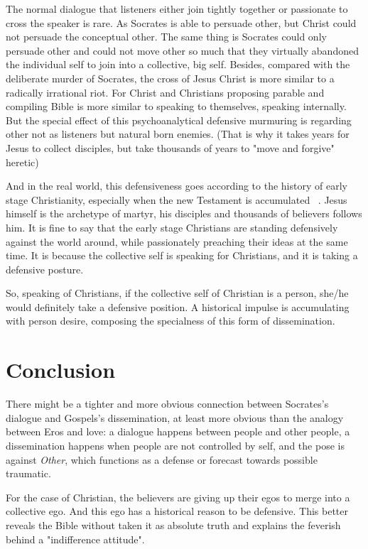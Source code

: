 \documentclass[]{article}
\begin{document}
The normal dialogue that listeners either join tightly together or passionate to cross the speaker is rare. As Socrates is able to persuade other, but Christ could not persuade the conceptual other. The same thing is Socrates could only persuade other and could not move other so much that they virtually abandoned the individual self to join into a collective, big self. Besides, compared with the deliberate murder of Socrates, the cross of Jesus Christ is more similar to a radically irrational riot. For Christ and Christians proposing parable and compiling Bible is more similar to speaking to themselves, speaking internally. But the special effect of this psychoanalytical defensive murmuring is regarding other not as listeners but natural born enemies. (That is why it takes years for Jesus to collect disciples, but take thousands of years to "move and forgive" heretic)


And in the real world, this defensiveness goes according to the history of early stage Christianity, especially when the new Testament is accumulated ~\cite{warfield1948inspiration}. Jesus himself is the archetype of martyr, his disciples and thousands of believers follows him. It is fine to say that the early stage Christians are standing defensively against the world around, while passionately preaching their ideas at the same time. It is because the collective self is speaking for Christians, and it is taking a defensive posture.

So, speaking of Christians, if the collective self of Christian is a person, she/he would definitely take a defensive position. A historical impulse is accumulating with person desire, composing the specialness of this form of dissemination. 

\section{Conclusion}

There might be a tighter and more obvious connection between Socrates's dialogue and Gospels's dissemination, at least more obvious than the analogy between Eros and love: a dialogue happens between people and other people, a dissemination happens when people are not controlled by self, and the pose is against \textit{Other}, which functions as a defense or forecast towards possible traumatic. 

For the case of Christian, the believers are giving up their egos to merge into a collective ego. And this ego has a historical reason to be defensive. This better reveals the Bible without taken it as absolute truth and explains the feverish behind a "indifference attitude". 



\end{document}
